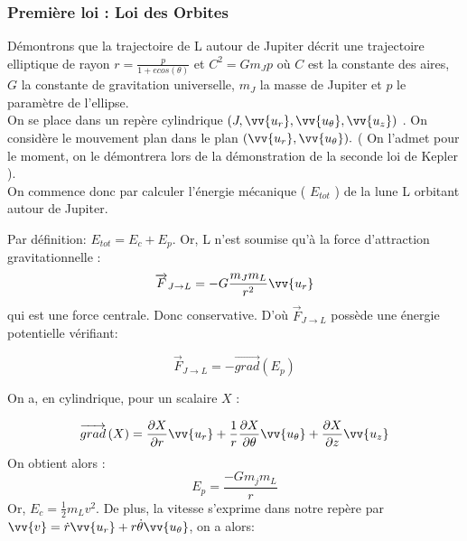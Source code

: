 \documentclass{aa}
\begin{document}
\subsubsection{Première loi : Loi des Orbites }

Démontrons que la trajectoire de L autour de Jupiter décrit une trajectoire elliptique de rayon $r = \frac{p}{1+ecos(\theta)}$ et $C^2 =Gm_Jp $ où $C$ est la constante des aires, $G$ la constante de gravitation universelle, $m_J$ la masse de Jupiter et $p$ le paramètre de l'ellipse. \\


On se place dans un repère cylindrique $(J,\vv{u_r}, \vv{u_\theta}, \vv{u_z})$
. On considère le mouvement plan dans le plan $(\vv{u_r},\vv{u_\theta}).$ ( On l'admet pour le moment, on le démontrera lors de la démonstration de la seconde loi de Kepler ). \\
On commence donc par calculer l'énergie mécanique ( $E_{tot}
$ ) de la lune L orbitant autour de Jupiter. \break

Par définition: $E_{tot} = E_c + E_p$. Or, L n'est soumise qu'à la force d'attraction gravitationnelle :
\begin{equation}
    \overrightarrow{F}_{J\rightarrow L} = -G\frac{m_Jm_L}{r^2}\vv{u_r}    
\end{equation}
qui est une force centrale. Donc conservative. D'où $\overrightarrow{F}_{J\rightarrow L}$ possède une énergie potentielle vérifiant: 

\begin{equation}
    \overrightarrow{F}_{J\rightarrow L}= -\overrightarrow{grad}(E_p)
\end{equation}
    
\begin{flushleft}
On a, en cylindrique, pour un scalaire $X$ :
\end{flushleft}

\begin{equation}
    \overrightarrow{grad}\left( X\right) = \frac{\partial{X}}{\partial{r}}\vv{u_r} + \frac{1}{r}\frac{\partial{X}}{\partial{\theta}}\vv{u_\theta} + \frac{\partial{X}}{\partial{z}}\vv{u_z}
\end{equation}
On obtient alors : 
\begin{equation}
E_p = \frac{-Gm_jm_L}{r}
\end{equation}
Or, $E_c = \frac{1}{2} m_L v^{2}$. De plus, la vitesse s'exprime dans notre repère par $\vv{v}=\dot{r}\vv{u_r} + r\dot{\theta}\vv{u_\theta}$, on a alors:
\end{document}
